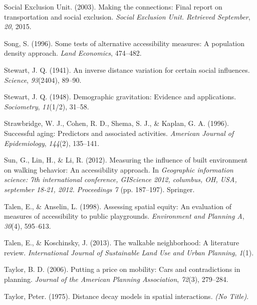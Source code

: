\documentclass[12pt,twoside]{reedthesis}
\newlength{\cslhangindent}
\newenvironment{CSLReferences}[2] %
 {%
  \setlength{\parindent}{0pt}
  \ifodd #1 \everypar{\setlength{\hangindent}{\cslhangindent}}\ignorespaces\fi
  \ifnum #2 > 0
  \setlength{\parskip}{#2\baselineskip}
  \fi
 }%
 {}
\begin{document}
\begin{CSLReferences}{1}{0}
\leavevmode{}%
Social Exclusion Unit. (2003). Making the connections: Final report on transportation and social exclusion. \emph{Social Exclusion Unit. Retrieved September}, \emph{20}, 2015.

\leavevmode{}%
Song, S. (1996). Some tests of alternative accessibility measures: A population density approach. \emph{Land Economics}, 474--482.

\leavevmode{}%
Stewart, J. Q. (1941). An inverse distance variation for certain social influences. \emph{Science}, \emph{93}(2404), 89--90.

\leavevmode{}%
Stewart, J. Q. (1948). Demographic gravitation: Evidence and applications. \emph{Sociometry}, \emph{11}(1/2), 31--58.

\leavevmode{}%
Strawbridge, W. J., Cohen, R. D., Shema, S. J., \& Kaplan, G. A. (1996). Successful aging: Predictors and associated activities. \emph{American Journal of Epidemiology}, \emph{144}(2), 135--141.

\leavevmode{}%
Sun, G., Lin, H., \& Li, R. (2012). Measuring the influence of built environment on walking behavior: An accessibility approach. In \emph{Geographic information science: 7th international conference, GIScience 2012, columbus, OH, USA, september 18-21, 2012. Proceedings 7} (pp. 187--197). Springer.

\leavevmode{}%
Talen, E., \& Anselin, L. (1998). Assessing spatial equity: An evaluation of measures of accessibility to public playgrounds. \emph{Environment and Planning A}, \emph{30}(4), 595--613.

\leavevmode{}%
Talen, E., \& Koschinsky, J. (2013). The walkable neighborhood: A literature review. \emph{International Journal of Sustainable Land Use and Urban Planning}, \emph{1}(1).

\leavevmode{}%
Taylor, B. D. (2006). Putting a price on mobility: Cars and contradictions in planning. \emph{Journal of the American Planning Association}, \emph{72}(3), 279--284.

\leavevmode{}%
Taylor, Peter. (1975). Distance decay models in spatial interactions. \emph{(No Title)}.


\end{CSLReferences}
\end{document}

